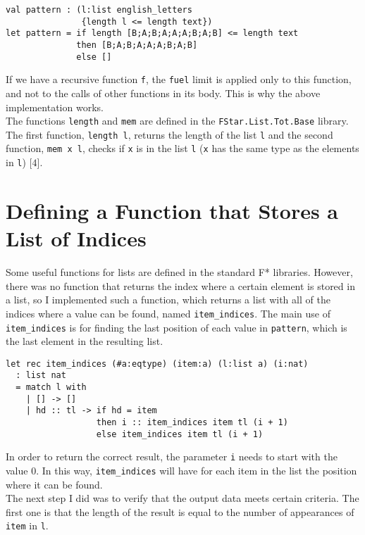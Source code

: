 \begin{verbatim}
val pattern : (l:list english_letters
               {length l <= length text}) 
let pattern = if length [B;A;B;A;A;A;B;A;B] <= length text
              then [B;A;B;A;A;A;B;A;B]
              else []
\end{verbatim}

If we have a recursive function \texttt{f}, the \texttt{fuel} limit is applied only to this function, and not to the calls of other functions in its body. This is why the above implementation works. \\
\indent The functions \texttt{length} and \texttt{mem} are defined in the \texttt{FStar.List.Tot.Base} library. The first function,  \texttt{length l}, returns the length of the list \texttt{l} and the second function, \texttt{mem x l}, checks if \texttt{x} is in the list \texttt{l} (\texttt{x} has the same type as the elements in \texttt{l}) [\(4\)].

\section{Defining a Function that Stores a List of Indices}

Some useful functions for lists are defined in the standard F* libraries. However, there was no function that returns the index where a certain element is stored in a list, so I implemented such a function, which returns a list with all of the indices where a value can be found, named \texttt{item\_indices}. The main use of \texttt{item\_indices} is for finding the last position of each value in \texttt{pattern}, which is the last element in the resulting list. 

\begin{verbatim}
let rec item_indices (#a:eqtype) (item:a) (l:list a) (i:nat) 
  : list nat 
  = match l with   
    | [] -> [] 
    | hd :: tl -> if hd = item 
                  then i :: item_indices item tl (i + 1) 
                  else item_indices item tl (i + 1)
\end{verbatim}

In order to return the correct result, the parameter \texttt{i} needs to start with the value \(0\). In this way, \texttt{item\_indices} will have for each item in the list the position where it can be found. \\
\indent The next step I did was to verify that the output data meets certain criteria. The first one is that the length of the result is equal to the number of appearances of \texttt{item} in \texttt{l}.

